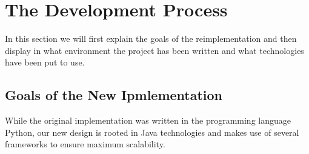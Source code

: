 \documentclass[12pt]{article}
\begin{document}




\section{The Development Process}

In this section we will first explain the goals of the reimplementation and then
display in what environment the project has been written and what technologies
have been put to use. 

\subsection{Goals of the New Ipmlementation}

 While the original implementation was
 written in the programming language
 Python, our new design is rooted in Java
 technologies and makes use of several frameworks to ensure maximum scalability.
 
\end{document}
